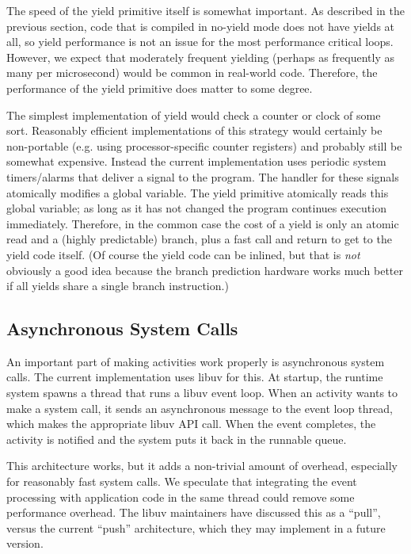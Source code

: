 \documentclass[9pt,preprint]{sigplanconf}
\begin{document}
The speed of the yield primitive itself is somewhat important.
As described in the previous section, code that is compiled in no-yield mode does not have yields at all, so yield performance is not an issue for the most performance critical loops.
However, we expect that moderately frequent yielding (perhaps as frequently as many per microsecond) would be common in real-world code.
Therefore, the performance of the yield primitive does matter to some degree.

The simplest implementation of yield would check a counter or clock of some sort.
Reasonably efficient implementations of this strategy would certainly be non-portable (e.g. using processor-specific counter registers) and probably still be somewhat expensive.
Instead the current \charcoal{} implementation uses periodic system timers/alarms that deliver a signal to the program.
The handler for these signals atomically modifies a global variable.
The yield primitive atomically reads this global variable; as long as it has not changed the program continues execution immediately.
Therefore, in the common case the cost of a yield is only an atomic read and a (highly predictable) branch, plus a fast call and return to get to the yield code itself.
(Of course the yield code can be inlined, but that is \emph{not} obviously a good idea because the branch prediction hardware works much better if all yields share a single branch instruction.)

\subsection{Asynchronous System Calls}

An important part of making activities work properly is asynchronous system calls.
The current \charcoal{} implementation uses libuv for this.
At startup, the runtime system spawns a thread that runs a libuv event loop.
When an activity wants to make a system call, it sends an asynchronous message to the event loop thread, which makes the appropriate libuv API call.
When the event completes, the activity is notified and the system puts it back in the runnable queue.

This architecture works, but it adds a non-trivial amount of overhead, especially for reasonably fast system calls.
We speculate that integrating the event processing with application code in the same thread could remove some performance overhead.
The libuv maintainers have discussed this as a ``pull'', versus the current ``push'' architecture, which they may implement in a future version.
\end{document}
